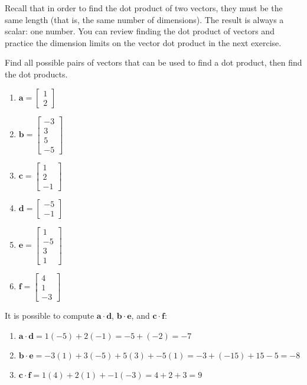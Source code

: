 Recall that in order to find the dot product of two vectors, they must be the 
same length (that is, the same number of dimensions). The result is always a 
scalar: one number. You can review finding the dot product of vectors and 
practice the dimension limits on the vector dot product in the next exercise.

\begin{Exercise}[title = {Vector Dot Product Review}, label = vect_dot]
Find all possible pairs of vectors that can be used to find a dot product, 
then find the dot products. 
\begin{enumerate}
\item $\mathbf{a} = \begin{bmatrix}
1\\
2
\end{bmatrix}$
\item $\mathbf{b} = \begin{bmatrix}
-3\\
3\\
5\\
-5
\end{bmatrix}$
\item $\mathbf{c} = \begin{bmatrix}
1\\
2\\
-1
\end{bmatrix}$
\item $\mathbf{d} = \begin{bmatrix}
-5\\
-1
\end{bmatrix}$
\item $\mathbf{e} = \begin{bmatrix}
1\\
-5\\
3\\
1
\end{bmatrix}$
\item $\mathbf{f} = \begin{bmatrix}
4\\
1\\
-3
\end{bmatrix}$
\end{enumerate}
\end{Exercise}

\begin{Answer}[ref = vect_dot]
It is possible to compute $\mathbf{a} \cdot \mathbf{d}$, $\mathbf{b} \cdot 
\mathbf{e}$, and $\mathbf{c} \cdot \mathbf{f}$:
\begin{enumerate}
    \item $\mathbf{a} \cdot \mathbf{d} = 1(-5) + 2(-1) = -5 + (-2) = -7$
    \item $\mathbf{b} \cdot \mathbf{e} = -3(1) + 3(-5) + 5(3) + -5(1) = -3 + 
    (-15) + 15 - 5 = -8$
    \item $\mathbf{c} \cdot \mathbf{f} = 1(4) + 2(1) + -1(-3) = 4 + 2 + 3 = 9$
\end{enumerate}
\end{Answer}

